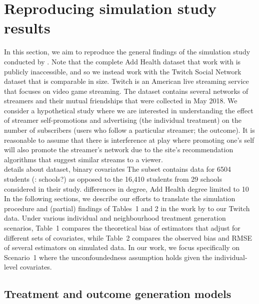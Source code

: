 \documentclass[10pt]{article}
\begin{document}
\section{Reproducing simulation study results}

In this section, we aim to reproduce the general findings of the simulation study conducted by \textcite{Forastiere:2021}. Note that the complete Add Health dataset that \citeauthor{Forastiere:2021} work with is publicly inaccessible, and so we instead work with the Twitch Social Network dataset \parencite{Rozemberczki:2021} that is comparable in size. Twitch is an American live streaming service that focuses on video game streaming. The dataset contains several networks of streamers and their mutual friendships that were collected in May 2018. We consider a hypothetical study where we are interested in understanding the effect of streamer self-promotions and advertising (the individual treatment) on the number of subscribers (users who follow a particular streamer; the outcome). It is reasonable to assume that there is interference at play where promoting one's self will also promote the streamer's network due to the site's recommendation algorithms that suggest similar streams to a viewer.
\\

\todo details about dataset, binary covariates  The subset contains data for 6504 students (\todo: schools?) as opposed to the 16,410 students from 29 schools considered in their study. differences in degree, Add Health degree limited to 10
\\

In the following sections, we describe our efforts to translate the simulation procedure and (partial) findings of Tables~1 and 2 in the work by \textcite{Forastiere:2021} to our Twitch data. Under various individual and neighbourhood treatment generation scenarios, Table~1 compares the theoretical bias of estimators that adjust for different sets of covariates, while Table~2 compares the observed bias and RMSE of several estimators on simulated data. In our work, we focus specifically on Scenario~1 where the unconfoundedness assumption holds given the individual-level covariates.

\subsection{Treatment and outcome generation models} \label{sec:models}
\end{document}
